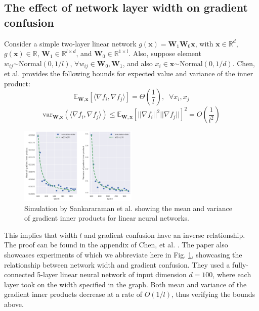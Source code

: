 \documentclass{article}
\begin{document}
\subsection{The effect of network layer width on gradient confusion}
Consider a simple two-layer linear network $g(\textbf{x}) = \textbf{W}_1 \textbf{W}_0 \textbf{x}$, with $\textbf{x} \in \mathbb{R}^d$, $g(\textbf{x}) \in \mathbb{R}$, $\textbf{W}_1 \in \mathbb{R}^{l \times d}$, and $\textbf{W}_0 \in \mathbb{R}^{1 \times l}$. Also, suppose element $w_{ij} \stackrel{}{\sim} \text{Normal}(0, 1/l)$, $\forall w_{ij} \in \textbf{W}_0, \textbf{W}_1$, and also $x_i \in \textbf{x} \stackrel{}{\sim} \text{Normal}(0, 1/d)$. Chen, et al. \cite{chen} provides the following bounds for expected value and variance of the inner product:
$$\mathbb{E}_{\textbf{W}, \textbf{x}}[\langle \nabla f_i, \nabla f_j \rangle] = \Theta(\frac{1}{l}), \;\; \forall x_i, x_j$$
$$\text{var}_{\textbf{W}, \textbf{x}}(\langle \nabla f_i, \nabla f_j \rangle) \leq \mathbb{E}_{\mathbf{W}, \mathbf{x}} [||\nabla f_i||^2 ||\nabla f_j||]^2 = O(\frac{1}{l^2})$$

\begin{figure}[h]
	\centering
    \includegraphics[width=0.5\textwidth]{pics/overparameterization/grad_inner_prod_exp_var.png}
	\caption{Simulation by Sankararaman et al. \cite{gradient_confusion} showing the mean and variance of gradient inner products for linear neural networks.}
	\label{fig:mean_inner_prod}
\end{figure}

This implies that width $l$ and gradient confusion have an inverse relationship. The proof can be found in the appendix of Chen, et al. \cite{chen}. The paper also showcases experiments of which we abbreviate here in Fig. \ref{fig:mean_inner_prod}, showcasing the relationship between network width and gradient confusion. They used a fully-connected 5-layer linear neural network of input dimension $d = 100$, where each layer took on the width specified in the graph. Both mean and variance of the gradient inner products decrease at a rate of $O(1/l)$, thus verifying the bounds above.
\end{document}
